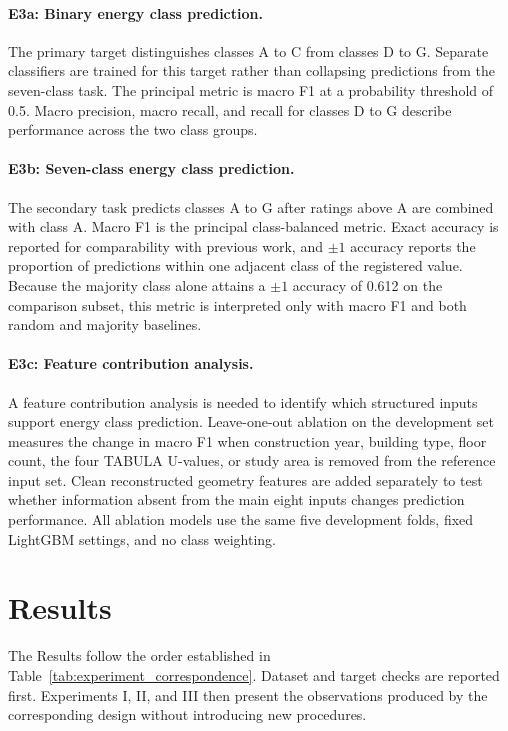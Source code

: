 \paragraph{E3a: Binary energy class prediction.}
The primary target distinguishes classes A to C from classes D to G. Separate classifiers are trained for this target rather than collapsing predictions from the seven-class task. The principal metric is macro F1 at a probability threshold of 0.5. Macro precision, macro recall, and recall for classes D to G describe performance across the two class groups.

\paragraph{E3b: Seven-class energy class prediction.}
The secondary task predicts classes A to G after ratings above A are combined with class A. Macro F1 is the principal class-balanced metric. Exact accuracy is reported for comparability with previous work, and $\pm1$ accuracy reports the proportion of predictions within one adjacent class of the registered value. Because the majority class alone attains a $\pm1$ accuracy of 0.612 on the comparison subset, this metric is interpreted only with macro F1 and both random and majority baselines.

\paragraph{E3c: Feature contribution analysis.}
A feature contribution analysis is needed to identify which structured inputs support energy class prediction. Leave-one-out ablation on the development set measures the change in macro F1 when construction year, building type, floor count, the four TABULA U-values, or study area is removed from the reference input set. Clean reconstructed geometry features are added separately to test whether information absent from the main eight inputs changes prediction performance. All ablation models use the same five development folds, fixed LightGBM settings, and no class weighting.

\section{Results}
\label{sec:quantitative_results}

The Results follow the order established in Table~\ref{tab:experiment_correspondence}. Dataset and target checks are reported first. Experiments I, II, and III then present the observations produced by the corresponding design without introducing new procedures.

